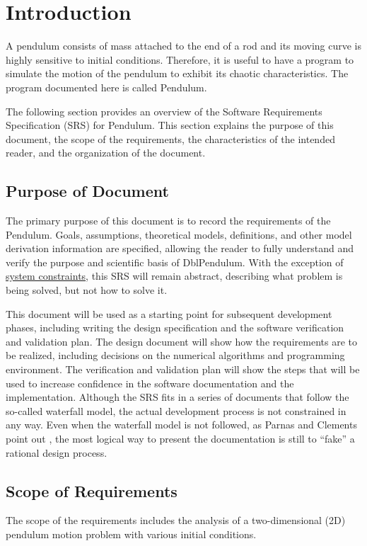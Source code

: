 \documentclass[12pt]{article}
\begin{document}
\section{Introduction}
\label{Sec:Intro}
A pendulum consists of mass attached to the end of a rod and its moving curve is highly sensitive to initial conditions. Therefore, it is useful to have a program to simulate the motion of the pendulum to exhibit its chaotic characteristics. The program documented here is called Pendulum.

The following section provides an overview of the Software Requirements Specification (SRS) for Pendulum. This section explains the purpose of this document, the scope of the requirements, the characteristics of the intended reader, and the organization of the document.

\subsection{Purpose of Document}
\label{Sec:DocPurpose}
The primary purpose of this document is to record the requirements of the Pendulum. Goals, assumptions, theoretical models, definitions, and other model derivation information are specified, allowing the reader to fully understand and verify the purpose and scientific basis of DblPendulum. With the exception of \hyperref[Sec:SysConstraints]{system constraints}, this SRS will remain abstract, describing what problem is being solved, but not how to solve it.

This document will be used as a starting point for subsequent development phases, including writing the design specification and the software verification and validation plan. The design document will show how the requirements are to be realized, including decisions on the numerical algorithms and programming environment. The verification and validation plan will show the steps that will be used to increase confidence in the software documentation and the implementation. Although the SRS fits in a series of documents that follow the so-called waterfall model, the actual development process is not constrained in any way. Even when the waterfall model is not followed, as Parnas and Clements point out \cite{parnasClements1986}, the most logical way to present the documentation is still to ``fake'' a rational design process.

\subsection{Scope of Requirements}
\label{Sec:ReqsScope}
The scope of the requirements includes the analysis of a two-dimensional (2D) pendulum motion problem with various initial conditions.
\end{document}

